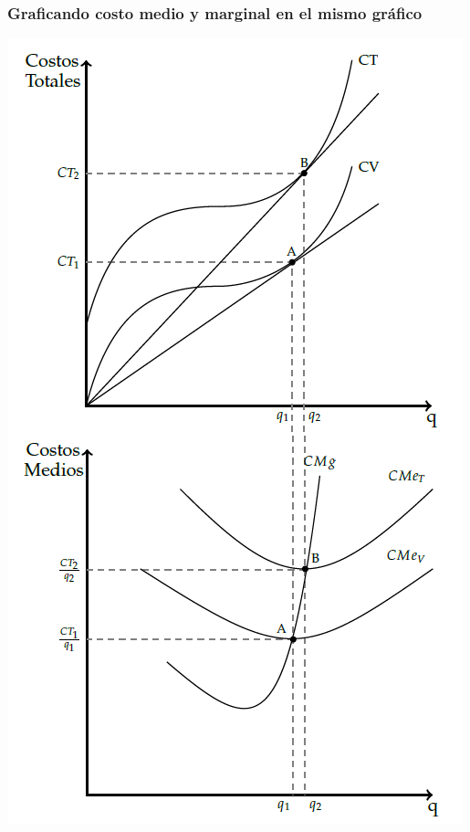 \documentclass{beamer}
\begin{document}
\begin{frame}
\frametitle{Graficando costo medio y marginal en el mismo gráfico}
\centering
\includegraphics[scale=0.9]{Slides Principios de Economia/Figures/Costoscp.png}
\end{frame}

\end{document}

